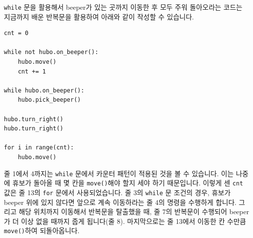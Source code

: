 \documentclass[../main.tex]{subfiles}
\begin{document}
\texttt{while} 문을 활용해서 beeper가 있는 곳까지 이동한 후 모두 주워 돌아오라는 코드는 지금까지 배운 반복문을 활용하여 아래와 같이 작성할 수 있습니다.
\begin{verbatim}
cnt = 0

while not hubo.on_beeper():
	hubo.move()
	cnt += 1

while hubo.on_beeper():
	hubo.pick_beeper()

hubo.turn_right()
hubo.turn_right()

for i in range(cnt):
	hubo.move()
\end{verbatim}
줄 1에서 4까지는 \texttt{while} 문에서 카운터 패턴이 적용된 것을 볼 수 있습니다.
이는 나중에 휴보가 돌아올 때 몇 칸을 \texttt{move()}해야 할지 세야 하기 때문입니다.
이렇게 센 \texttt{cnt} 값은 줄 13의 \texttt{for} 문에서 사용되었습니다.
줄 3의 \texttt{while} 문 조건의 경우, 휴보가 beeper 위에 있지 않다면 앞으로 계속 이동하라는 줄 4의 명령을 수행하게 합니다.
그리고 해당 위치까지 이동해서 반복문을 탈출했을 때, 줄 7의 반복문이 수행되어 beeper가 더 이상 없을 때까지 줍게 됩니다(줄 8).
마지막으로는 줄 13에서 이동한 칸 수만큼 \texttt{move()}하여 되돌아옵니다.
\end{document}
